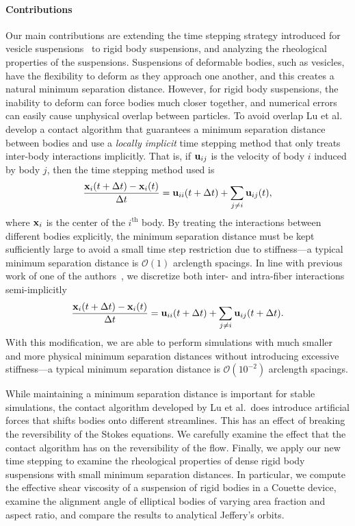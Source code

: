 \documentclass[preprint, 10pt]{elsarticle}
\begin{document}
\paragraph{Contributions} Our main contributions are extending the time
stepping strategy introduced for vesicle suspensions~\cite{Quaife2014}
to rigid body suspensions, and analyzing the rheological properties of
the suspensions.  Suspensions of deformable bodies, such as vesicles, have
the flexibility to deform as they approach one another, and this creates
a natural minimum separation distance.  However, for rigid body
suspensions, the inability to deform can force bodies much closer
together, and numerical errors can easily cause unphysical overlap between particles.  To
avoid overlap Lu et al.~\cite{Lu2017} develop a contact algorithm that
guarantees a minimum separation distance between bodies and use a {\em
locally implicit} time stepping method that only treats inter-body
interactions implicitly.  That is, if ${\mathbf{u}}_{ij}$ is the velocity of body
$i$ induced
by body $j$, then the time stepping method used is
\begin{align*}
  \frac{{\mathbf{x}}_i(t + \Delta t) -  {\mathbf{x}}_i(t)}{\Delta t} = 
    {\mathbf{u}}_{ii}(t+\Delta t) + \sum_{j \neq i} {\mathbf{u}}_{ij}(t),
\end{align*}
where ${\mathbf{x}}_i$ is the center of the $i^{\mathrm{th}}$ body.  By treating
the interactions between different bodies explicitly, the minimum
separation distance must be kept sufficiently large to avoid a small
time step restriction due to stiffness---a typical minimum separation
distance is $\mathcal{O}(1)$ arclength spacings.  In line with previous
work of one of the authors~\cite{Quaife2014}, we discretize both inter-
and intra-fiber interactions semi-implicitly
\begin{align*}
  \frac{{\mathbf{x}}_i(t + \Delta t) -  {\mathbf{x}}_i(t)}{\Delta t} = 
    {\mathbf{u}}_{ii}(t+\Delta t) + \sum_{j \neq i} {\mathbf{u}}_{ij}(t+\Delta t).
\end{align*}
With this modification, we are able to perform simulations with much
smaller and more physical minimum separation distances without
introducing excessive stiffness---a typical minimum separation distance
is $\mathcal{O}(10^{-2})$ arclength spacings.

While maintaining a minimum separation distance is important for stable
simulations, the contact algorithm developed by Lu et al.~does introduce
artificial forces that shifts bodies onto different streamlines.  This
has an effect of breaking the reversibility of the Stokes equations.  We
carefully examine the effect that the contact algorithm has on the
reversibility of the flow.  Finally, we apply our new time stepping to
examine the rheological properties of dense rigid body suspensions with
small minimum separation distances.  In particular, we compute the
effective shear viscosity of a suspension of rigid bodies in a Couette
device, examine the alignment angle of elliptical bodies of varying area
fraction and aspect ratio, and compare the results to analytical
Jeffery's orbits.
\end{document}
